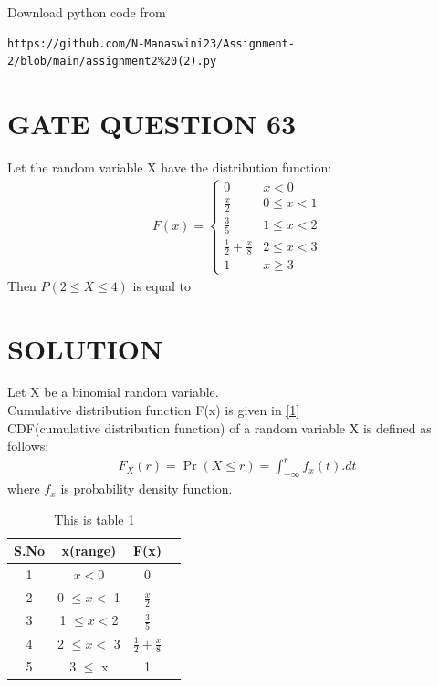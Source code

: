 \documentclass[journal,12pt,twocolumn]{IEEEtran}
\begin{document}
\renewcommand{\thefigure}{\theenumi}
\renewcommand{\thetable}{\theenumi}
Download python code from 
\begin{lstlisting}
https://github.com/N-Manaswini23/Assignment-2/blob/main/assignment2%20(2).py
\end{lstlisting}
%

\section*{GATE QUESTION 63}
Let the random variable X have the distribution function:
\begin{align}
F(x) = \begin{cases}
0 & x < 0
\\
\frac{x}{2} & 0 \leq x < 1 
\\
\frac{3}{5} & 1 \leq x < 2
\\
\frac{1}{2}+\frac{x}{8} & 2 \leq x < 3
\\
1 & x \geq 3
\end{cases} \label{1}
\end{align}
Then $P (2 \leq X \leq 4)$ is equal to


\section*{SOLUTION}
Let X be a binomial random variable. \\
Cumulative distribution function F(x) is given in \eqref{1}\\
CDF(cumulative distribution function) of a random variable X is defined as follows:\\
\begin{align}
F_X(r) = \Pr (X \leq r) = \int _{- \infty }^{r}f_x(t).dt 
\end{align}
where $f_x$ is probability density function.
\begin{table}[h!]
\resizebox{7cm}{!}
{ 
\begin{tabular}{|c|c|c|c|}
\hline
S.No & x(range) & F(x) \\
\hline
1 & $x < 0$ & 0 \\
\hline
2 & 0 $\leq x < $ 1 & $\frac{x}{2}$\\
\hline
3 & 1 $\leq  x < $2 & $\frac{3}{5}$\\
\hline
4 & 2 $\leq x  < $ 3 & $\frac{1}{2}+\frac{x}{8}$  \\
\hline
5 & 3 $\leq$ x & 1\\
\hline
\end{tabular} 
}
\caption{This is table 1}
\label{table:1}
\end{table}
\end{document}
